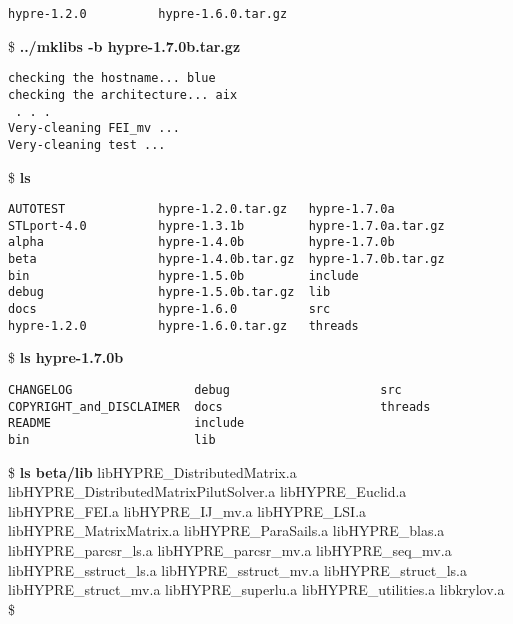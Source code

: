 \begin{ttfamily}
\begin{mdseries}
\begin{verbatim}
hypre-1.2.0          hypre-1.6.0.tar.gz
\end{verbatim}
\$ \textbf{../mklibs -b hypre-1.7.0b.tar.gz}\linebreak
\begin{verbatim}
checking the hostname... blue
checking the architecture... aix
 . . .
Very-cleaning FEI_mv ...
Very-cleaning test ...
\end{verbatim}
\$ \textbf{ls}\linebreak
\begin{verbatim}
AUTOTEST             hypre-1.2.0.tar.gz   hypre-1.7.0a
STLport-4.0          hypre-1.3.1b         hypre-1.7.0a.tar.gz
alpha                hypre-1.4.0b         hypre-1.7.0b
beta                 hypre-1.4.0b.tar.gz  hypre-1.7.0b.tar.gz
bin                  hypre-1.5.0b         include
debug                hypre-1.5.0b.tar.gz  lib
docs                 hypre-1.6.0          src
hypre-1.2.0          hypre-1.6.0.tar.gz   threads
\end{verbatim}
\$ \textbf{ls hypre-1.7.0b}\linebreak
\begin{verbatim}
CHANGELOG                 debug                     src
COPYRIGHT_and_DISCLAIMER  docs                      threads
README                    include
bin                       lib
\end{verbatim}
\$ \textbf{ls beta/lib}\linebreak
libHYPRE\_DistributedMatrix.a\linebreak
libHYPRE\_DistributedMatrixPilutSolver.a\linebreak
libHYPRE\_Euclid.a\linebreak
libHYPRE\_FEI.a\linebreak
libHYPRE\_IJ\_mv.a\linebreak
libHYPRE\_LSI.a\linebreak
libHYPRE\_MatrixMatrix.a\linebreak
libHYPRE\_ParaSails.a\linebreak
libHYPRE\_blas.a\linebreak
libHYPRE\_parcsr\_ls.a\linebreak
libHYPRE\_parcsr\_mv.a\linebreak
libHYPRE\_seq\_mv.a\linebreak
libHYPRE\_sstruct\_ls.a\linebreak
libHYPRE\_sstruct\_mv.a\linebreak
libHYPRE\_struct\_ls.a\linebreak
libHYPRE\_struct\_mv.a\linebreak
libHYPRE\_superlu.a\linebreak
libHYPRE\_utilities.a\linebreak
libkrylov.a\linebreak
\$ \linebreak
\end{mdseries}
\end{ttfamily}
